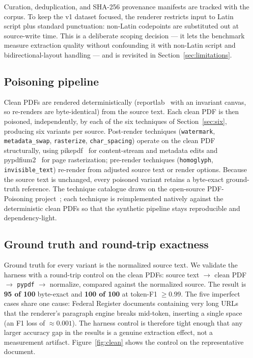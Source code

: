 \documentclass[11pt]{article}
\newcommand{\variant}[1]{\texttt{#1}}
\begin{document}
Curation, deduplication, and SHA-256 provenance manifests are tracked
with the corpus. To keep the v1 dataset focused, the renderer restricts
input to Latin script plus standard punctuation: non-Latin codepoints
are substituted out at source-write time. This is a deliberate scoping
decision --- it lets the benchmark measure extraction quality without
confounding it with non-Latin script and bidirectional-layout handling
--- and is revisited in Section~\ref{sec:limitations}.

\subsection{Poisoning pipeline}

Clean PDFs are rendered deterministically (reportlab~\cite{reportlab}
with an invariant canvas, so re-renders are byte-identical) from the
source text. Each clean PDF is then poisoned, independently, by each of
the six techniques of Section~\ref{sec:six}, producing six variants per
source. Post-render techniques (\variant{watermark},
\variant{metadata\_swap}, \variant{rasterize}, \variant{char\_spacing})
operate on the clean PDF structurally, using pikepdf~\cite{pikepdf} for
content-stream and metadata edits and pypdfium2~\cite{pypdfium2} for
page rasterization; pre-render techniques (\variant{homoglyph},
\variant{invisible\_text}) re-render from adjusted source text or render
options. Because the source text is unchanged, every poisoned variant
retains a byte-exact ground-truth reference. The technique catalogue
draws on the open-source PDF-Poisoning project~\cite{pdfpoisoning};
each technique is reimplemented natively against the deterministic
clean PDFs so that the synthetic pipeline stays reproducible and
dependency-light.

\subsection{Ground truth and round-trip exactness}
\label{sec:groundtruth}

Ground truth for every variant is the normalized source text. We
validate the harness with a round-trip control on the clean PDFs:
source text $\rightarrow$ clean PDF $\rightarrow$ \texttt{pypdf}
$\rightarrow$ normalize, compared against the normalized source. The
result is \textbf{95 of 100} byte-exact and \textbf{100 of 100} at
token-F1 $\geq 0.99$. The five imperfect cases share one cause: Federal
Register documents containing very long URLs that the renderer's
paragraph engine breaks mid-token, inserting a single space (an F1 loss
of $\approx 0.001$). The harness control is therefore tight enough that
any larger accuracy gap in the results is a genuine extraction effect,
not a measurement artifact. Figure~\ref{fig:clean} shows the control on
the representative document.
\end{document}

